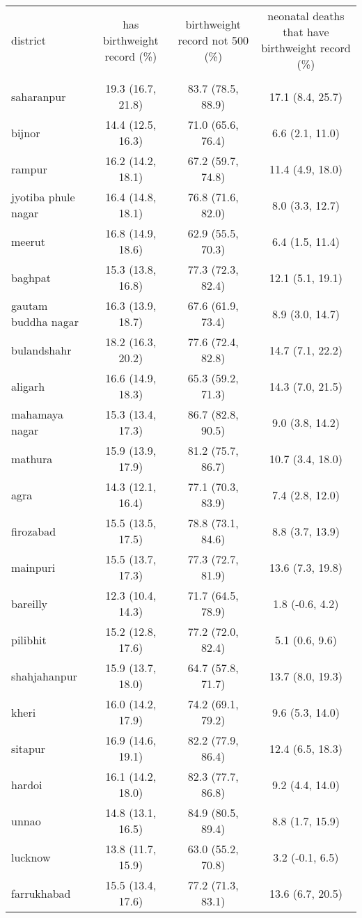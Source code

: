 \begin{tabular}{lccc}
\toprule
district & has birthweight record (\%) & birthweight record not 500 (\%) & neonatal deaths that have birthweight record (\%) \\\\
\midrule
saharanpur&19.3 (16.7, 21.8)&83.7 (78.5, 88.9)&17.1 (8.4, 25.7)\\
bijnor&14.4 (12.5, 16.3)&71.0 (65.6, 76.4)&6.6 (2.1, 11.0)\\
rampur&16.2 (14.2, 18.1)&67.2 (59.7, 74.8)&11.4 (4.9, 18.0)\\
jyotiba phule nagar&16.4 (14.8, 18.1)&76.8 (71.6, 82.0)&8.0 (3.3, 12.7)\\
meerut&16.8 (14.9, 18.6)&62.9 (55.5, 70.3)&6.4 (1.5, 11.4)\\
baghpat&15.3 (13.8, 16.8)&77.3 (72.3, 82.4)&12.1 (5.1, 19.1)\\
gautam buddha nagar&16.3 (13.9, 18.7)&67.6 (61.9, 73.4)&8.9 (3.0, 14.7)\\
bulandshahr&18.2 (16.3, 20.2)&77.6 (72.4, 82.8)&14.7 (7.1, 22.2)\\
aligarh&16.6 (14.9, 18.3)&65.3 (59.2, 71.3)&14.3 (7.0, 21.5)\\
mahamaya nagar&15.3 (13.4, 17.3)&86.7 (82.8, 90.5)&9.0 (3.8, 14.2)\\
mathura&15.9 (13.9, 17.9)&81.2 (75.7, 86.7)&10.7 (3.4, 18.0)\\
agra&14.3 (12.1, 16.4)&77.1 (70.3, 83.9)&7.4 (2.8, 12.0)\\
firozabad&15.5 (13.5, 17.5)&78.8 (73.1, 84.6)&8.8 (3.7, 13.9)\\
mainpuri&15.5 (13.7, 17.3)&77.3 (72.7, 81.9)&13.6 (7.3, 19.8)\\
bareilly&12.3 (10.4, 14.3)&71.7 (64.5, 78.9)&1.8 (-0.6, 4.2)\\
pilibhit&15.2 (12.8, 17.6)&77.2 (72.0, 82.4)&5.1 (0.6, 9.6)\\
shahjahanpur&15.9 (13.7, 18.0)&64.7 (57.8, 71.7)&13.7 (8.0, 19.3)\\
kheri&16.0 (14.2, 17.9)&74.2 (69.1, 79.2)&9.6 (5.3, 14.0)\\
sitapur&16.9 (14.6, 19.1)&82.2 (77.9, 86.4)&12.4 (6.5, 18.3)\\
hardoi&16.1 (14.2, 18.0)&82.3 (77.7, 86.8)&9.2 (4.4, 14.0)\\
unnao&14.8 (13.1, 16.5)&84.9 (80.5, 89.4)&8.8 (1.7, 15.9)\\
lucknow&13.8 (11.7, 15.9)&63.0 (55.2, 70.8)&3.2 (-0.1, 6.5)\\
farrukhabad&15.5 (13.4, 17.6)&77.2 (71.3, 83.1)&13.6 (6.7, 20.5)\\

\end{tabular}
